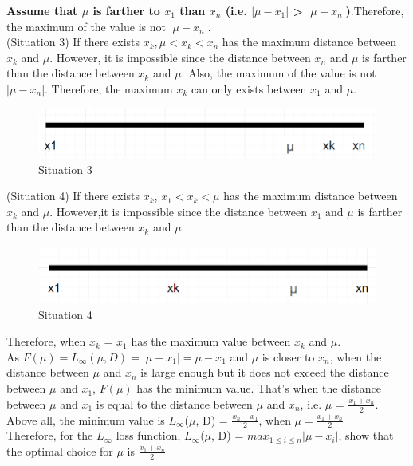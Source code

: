 \documentclass{article}
\begin{document}
\textbf{Assume that $\mu$ is farther to $x_1$ than $x_n$ (i.e. $|\mu - x_1|$ > $|\mu - x_n|$)}.Therefore, the maximum of the value is not $|\mu - x_n|$. \\(Situation 3) If there exists $x_k, \mu < x_k < x_n$ has the maximum distance between $x_k$ and $\mu$. However, it is impossible since the distance between $x_n$ and $\mu$ is farther than the distance between $x_k$ and $\mu$. Also, the maximum of the value is not $|\mu - x_n|$. Therefore, the maximum $x_k$ can only exists between $x_1$ and $\mu$.

\begin{figure}[H]
\centering
\includegraphics[width = \linewidth]{3.png}
\caption{Situation 3}
\end{figure}
(Situation 4) If there exists $x_k$, $x_1 < x_k < \mu$ has the maximum distance between $x_k$ and $\mu$. However,it is impossible since the distance between $x_1$ and $\mu$ is farther than the distance between $x_k$ and $\mu$. 
\begin{figure}[H]
\centering
\includegraphics[width = \linewidth]{4.png}
\caption{Situation 4}
\end{figure}

Therefore, when $x_k$ = $x_1$ has the maximum value between $x_k$ and $\mu$. \\
As $F(\mu) = L_{\infty}(\mu,D) = |\mu - x_1| = \mu - x_1$ and $\mu$ is closer to $x_n$, when the distance between $\mu$ and $x_n$ is large enough but it does not exceed the distance between $\mu$ and $x_1$, $F(\mu)$ has the minimum value. That's when the distance between $\mu$ and $x_1$ is equal to the distance between $\mu$ and $x_n$, i.e. $\mu$ = $\frac{x_1 + x_n}{2}$.\\

Above all, the minimum value is $L_{\infty}$($\mu$, D) = $\frac{x_n - x_1}{2}$, when $\mu = \frac{x_1 + x_n}{2}$\\

Therefore, for the $L_{\infty}$ loss function, $L_{\infty}$($\mu$, D) = $max_{1\leq i\leq n}|\mu-x_i|$, show that the optimal choice for $\mu$ is $\frac{x_1+x_n}{2}$\\
\end{document}
